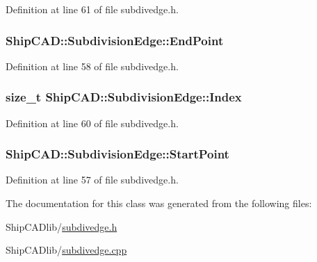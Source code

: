 Definition at line 61 of file subdivedge.\-h.

\hypertarget{classShipCAD_1_1SubdivisionEdge_ae9b9ffdb1e43bf851e5545f7d7a1849d}{
\subsubsection[{End\-Point}]{ Ship\-C\-A\-D\-::\-Subdivision\-Edge\-::\-End\-Point\hspace{0.3cm}{\ttfamily [read]}}}\label{classShipCAD_1_1SubdivisionEdge_ae9b9ffdb1e43bf851e5545f7d7a1849d}


Definition at line 58 of file subdivedge.\-h.

\hypertarget{classShipCAD_1_1SubdivisionEdge_ae683b98a87c34941bc550fe36666e184}{
\subsubsection[{Index}]{\setlength{\rightskip}{0pt plus 5cm}size\-\_\-t Ship\-C\-A\-D\-::\-Subdivision\-Edge\-::\-Index\hspace{0.3cm}{\ttfamily [read]}}}\label{classShipCAD_1_1SubdivisionEdge_ae683b98a87c34941bc550fe36666e184}


Definition at line 60 of file subdivedge.\-h.

\hypertarget{classShipCAD_1_1SubdivisionEdge_aa23b3f03ef499cfbd896c21987ad39b4}{
\subsubsection[{Start\-Point}]{ Ship\-C\-A\-D\-::\-Subdivision\-Edge\-::\-Start\-Point\hspace{0.3cm}{\ttfamily [read]}}}\label{classShipCAD_1_1SubdivisionEdge_aa23b3f03ef499cfbd896c21987ad39b4}


Definition at line 57 of file subdivedge.\-h.



The documentation for this class was generated from the following files\-:\begin{DoxyCompactItemize}
\item 
Ship\-C\-A\-Dlib/\hyperlink{subdivedge_8h}{subdivedge.\-h}\item 
Ship\-C\-A\-Dlib/\hyperlink{subdivedge_8cpp}{subdivedge.\-cpp}\end{DoxyCompactItemize}
